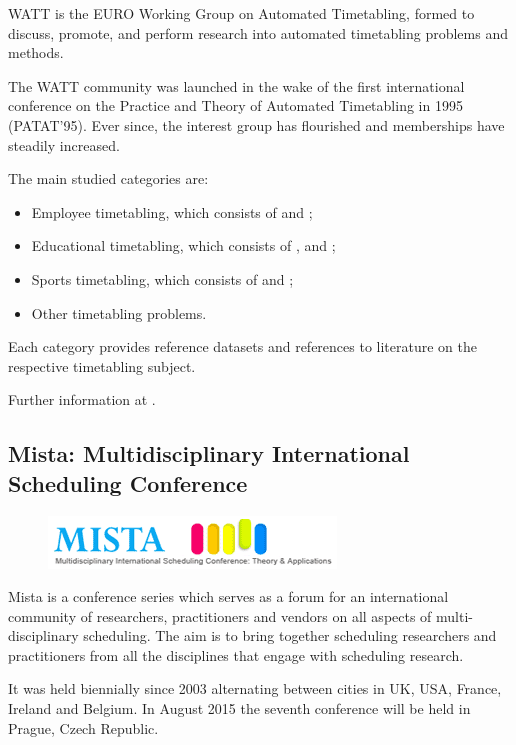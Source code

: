 WATT is the EURO Working Group on Automated Timetabling, formed to discuss, promote, and perform research into automated timetabling problems and methods.

The WATT community was launched in the wake of the first international conference on the Practice and Theory of Automated Timetabling in 1995 (PATAT'95). Ever since, the interest group has flourished and memberships have steadily increased.

The main studied categories are:
\begin{itemize}
\item Employee timetabling, which consists of  and ;
\item Educational timetabling, which consists of ,  and ;
\item Sports timetabling, which consists of  and ;
\item Other timetabling problems.
\end{itemize}
Each category provides reference datasets and references to literature on the respective timetabling subject.

Further information at \cite{Watt}.


\subsection{Mista: Multidisciplinary International Scheduling Conference}
\label{mista}

\begin{figure}[h]
\hfill\includegraphics[scale=0.7]{figures/mista.png}
\end{figure}

Mista is a conference series which serves as a forum for an international community of researchers, practitioners and vendors on all aspects of multi-disciplinary scheduling. The aim is to bring together scheduling researchers and practitioners from all the disciplines that engage with scheduling research. 

It was held biennially since 2003 alternating between cities in UK, USA, France, Ireland and Belgium. In August 2015 the seventh conference will be held in Prague, Czech Republic.

